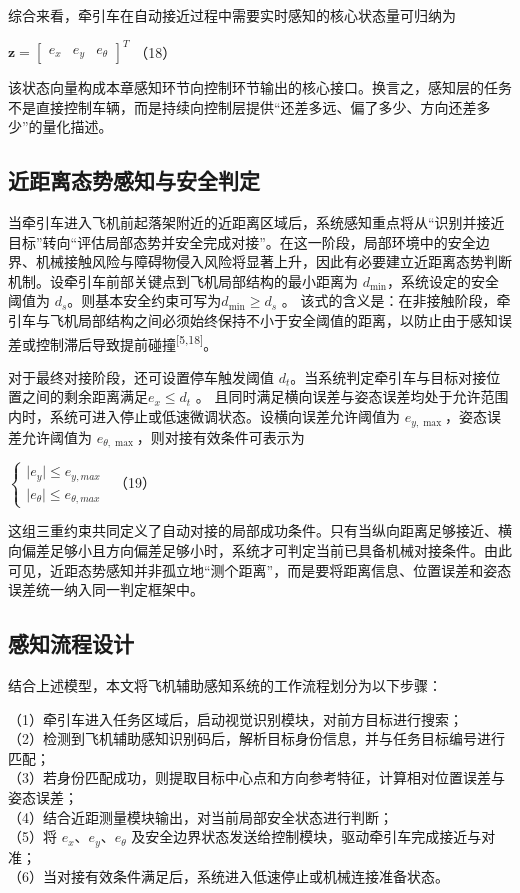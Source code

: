综合来看，牵引车在自动接近过程中需要实时感知的核心状态量可归纳为

\(\mathbf{z} = \begin{bmatrix}
e_{x} & e_{y} & e_{\theta}
\end{bmatrix}^{T}\) （18）

该状态向量构成本章感知环节向控制环节输出的核心接口。换言之，感知层的任务不是直接控制车辆，而是持续向控制层提供``还差多远、偏了多少、方向还差多少''的量化描述。

\subsection{近距离态势感知与安全判定}

当牵引车进入飞机前起落架附近的近距离区域后，系统感知重点将从``识别并接近目标''转向``评估局部态势并安全完成对接''。在这一阶段，局部环境中的安全边界、机械接触风险与障碍物侵入风险将显著上升，因此有必要建立近距离态势判断机制。设牵引车前部关键点到飞机局部结构的最小距离为
\(d_{\min}\)，系统设定的安全阈值为
\(d_{s}\)。则基本安全约束可写为\(d_{\min} \geq d_{s}\) 。\(
\)
该式的含义是：在非接触阶段，牵引车与飞机局部结构之间必须始终保持不小于安全阈值的距离，以防止由于感知误差或控制滞后导致提前碰撞\textsuperscript{[5,18]}。

对于最终对接阶段，还可设置停车触发阈值
\(d_{t}\)。当系统判定牵引车与目标对接位置之间的剩余距离满足\(e_{x} \leq d_{t}\)
。\(
\)
且同时满足横向误差与姿态误差均处于允许范围内时，系统可进入停止或低速微调状态。设横向误差允许阈值为
\(e_{y,\max}\)，姿态误差允许阈值为
\(e_{\theta,\max}\)，则对接有效条件可表示为

\(\left\{ \begin{array}{r}
 \mid e_{y} \mid \leq e_{y,max} \\
 \mid e_{\theta} \mid \leq e_{\theta,max}
\end{array} \right.\ \) （19）

这组三重约束共同定义了自动对接的局部成功条件。只有当纵向距离足够接近、横向偏差足够小且方向偏差足够小时，系统才可判定当前已具备机械对接条件。由此可见，近距态势感知并非孤立地``测个距离''，而是要将距离信息、位置误差和姿态误差统一纳入同一判定框架中。

\subsection{感知流程设计}

结合上述模型，本文将飞机辅助感知系统的工作流程划分为以下步骤：

（1）牵引车进入任务区域后，启动视觉识别模块，对前方目标进行搜索；\\
（2）检测到飞机辅助感知识别码后，解析目标身份信息，并与任务目标编号进行匹配；\\
（3）若身份匹配成功，则提取目标中心点和方向参考特征，计算相对位置误差与姿态误差；\\
（4）结合近距测量模块输出，对当前局部安全状态进行判断；\\
（5）将 \(e_{x}\)、\(e_{y}\)、\(e_{\theta}\)
及安全边界状态发送给控制模块，驱动牵引车完成接近与对准；\\
（6）当对接有效条件满足后，系统进入低速停止或机械连接准备状态。

